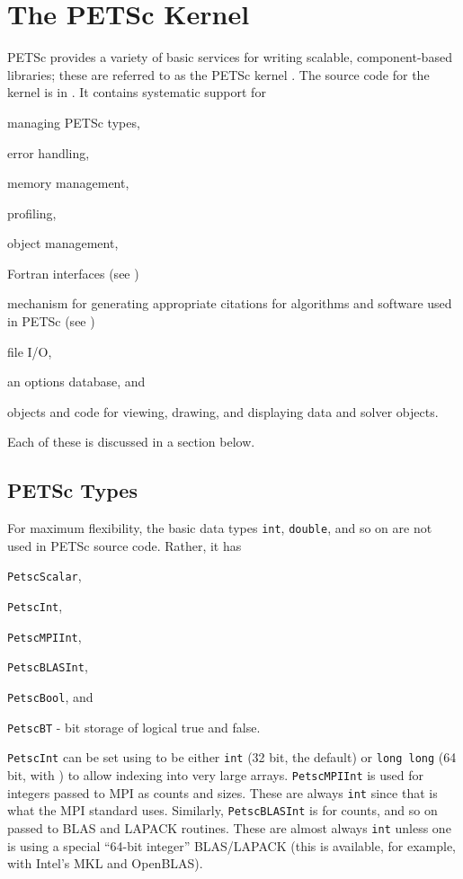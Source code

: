 \chapter{The PETSc Kernel}
\label{chapter:kernel}
PETSc provides a variety of basic services for writing scalable,
component-based libraries; these are referred to as the PETSc
kernel \cite{bgms98}. The source code for the kernel is
in . It contains systematic support for
\begin{tightitemize}
  \item managing PETSc types,
  \item error handling,
  \item memory management,
  \item profiling,
  \item object management,
  \item Fortran interfaces (see \cite{BalayBrownKnepleyMcInnesSmith2015})
  \item mechanism for generating appropriate citations for algorithms and software used in PETSc (see \cite{knepley2013accurately})
  \item file I/O,
  \item an options database, and
  \item objects and code for viewing, drawing, and displaying data and solver objects.
\end{tightitemize}
Each of these is discussed in a section below.

\section{PETSc Types}
For maximum flexibility, the basic data types \lstinline{int}, \lstinline{double}, and so on are
 not used in PETSc source code. Rather, it has
\begin{tightitemize}
  \item \lstinline{PetscScalar},
  \item \lstinline{PetscInt},
  \item \lstinline{PetscMPIInt},
  \item \lstinline{PetscBLASInt},
  \item \lstinline{PetscBool}, and
  \item \lstinline{PetscBT} - bit storage of logical true and false.
\end{tightitemize}
\lstinline{PetscInt} can be set using  to be either \lstinline{int} (32 bit, the default) or \lstinline{long long}
(64 bit, with ) to allow indexing into very large arrays.
\lstinline{PetscMPIInt} is used for integers passed to MPI as counts and sizes.
These are always \lstinline{int} since that is what the MPI standard uses.
Similarly, \lstinline{PetscBLASInt} is for counts, and so on passed to BLAS and LAPACK routines.
These are almost always \lstinline{int} unless one is using a special ``64-bit integer'' BLAS/LAPACK (this is available, for
example,  with Intel's MKL and OpenBLAS).

